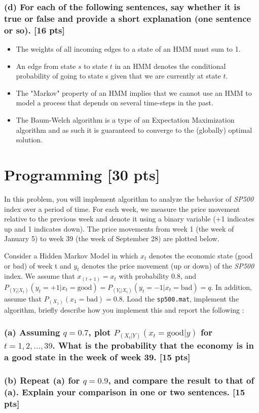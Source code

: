 \documentclass[twoside,11pt]{article}\usepackage{amsmath,amsfonts,amsthm,fullpage}
\begin{document}
\subsubsection*{(d) For each of the following sentences, say whether it is true or false and provide a short explanation (one
sentence or so). [16 pts]}

\begin{itemize}
  \item The weights of all incoming edges to a state of an HMM must sum to 1.
  \item An edge from state $s$ to state $t$ in an HMM denotes the conditional probability of going to state s given that we are currently at state $t$.
  \item The "Markov" property of an HMM implies that we cannot use an HMM to model a process that depends on several time-steps in the past.
  \item The Baum-Welch algorithm is a type of an Expectation Maximization algorithm and as such it is guaranteed to converge to the (globally) optimal solution.
\end{itemize}


\section{Programming [30 pts]}

In this problem, you will implement  algorithm to analyze the
behavior of \emph{SP500} index over a period of time. For each week,
we measure the price movement relative to the previous week and
denote it using a binary variable (+1 indicates up and 1 indicates
down). The price movements from week 1 (the week of January 5) to
week 39 (the week of September 28) are plotted below.

Consider a Hidden Markov Model in which $x_t$ denotes the economic
state (good or bad) of week t and $y_t$ denotes the price movement
(up or down) of the \emph{SP500} index. We assume that
$x_{(t+1)}=x_t$ with probability 0.8, and
$P_{(Y_t|X_t)}(y_t=+1|x_t=\text{good}) =
P_{(Y_t|X_t)}(y_t=-1|x_t=\text{bad}) = q.$ In addition, assume that
$P_{(X_1)}(x_1=\text{bad}) = 0.8$. Load the \texttt{sp500.mat},
implement the algorithm, briefly describe how you implement this and
report the following :

\subsubsection*{(a) Assuming $q = 0.7$, plot $P_{(X_t|Y)}(x_t = \text{good}|y)$ for $t = 1,2,...,39$. What is the probability that the economy is in a good state in the week of week 39. [15 pts]}

\subsubsection*{(b) Repeat (a) for $q = 0.9$, and compare the result to that of (a). Explain your comparison in one or two sentences. [15 pts]}
\end{document}
